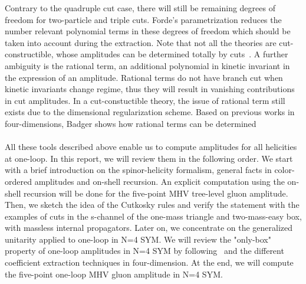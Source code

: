 Contrary to the quadruple cut case, there will still be remaining degrees of freedom for two-particle and triple cuts. 
Forde's parametrization reduces the number relevant polynomial terms in these degrees of freedom which should be taken into account during the extraction. 
Note that not all the theories are cut-constructible, \ie whose amplitudes can be determined totally by cuts~\cite{Bern:1994cg}. 
A further ambiguity is the rational term, \ie an additional polynomial in kinetic invariant in the expression of an amplitude. 
Rational terms do not have branch cut when kinetic invariants change regime, thus they will result in vanishing contributions in cut amplitudes.
In a cut-constuctible theory, the issue of rational term still exists due to the dimensional regularization scheme. 
Based on previous works in four-dimensions, Badger shows how rational terms can be determined~\cite{Badger:2008cm}
\\\\
All these tools described above enable us to compute amplitudes for all helicities at one-loop.
In this report, we will review them in the following order.
We start with a brief introduction on the spinor-helicity formalism, general facts in color-ordered amplitudes and on-shell recursion.
An explicit computation using the on-shell recursion will be done for the five-point MHV tree-level gluon amplitude. 
Then, we sketch the idea of the Cutkosky rules and verify the statement with the examples of cuts in the s-channel of the one-mass triangle and two-mass-easy box, with massless internal propagators.
Later on, we concentrate on the generalized unitarity applied to one-loop in N=4 SYM.
We will review the "only-box" property of one-loop amplitudes in N=4 SYM by following~\cite{Bern:1994zx} and the different coefficient extraction techniques in four-dimension. 
At the end, we will compute the five-point one-loop MHV gluon amplitude in N=4 SYM.











